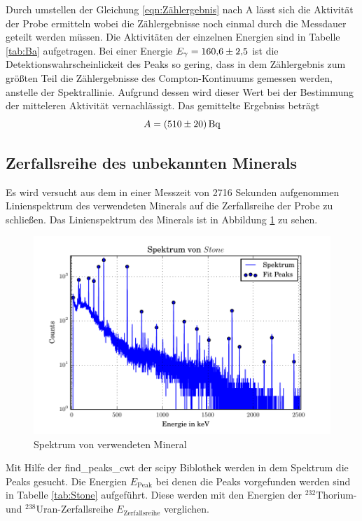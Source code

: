Durch umstellen der Gleichung \ref{eqn:Zählergebnis} nach A lässt sich die Aktivität der Probe ermitteln wobei die Zählergebnisse noch einmal durch die Messdauer geteilt werden müssen. Die Aktivitäten der einzelnen Energien sind in Tabelle \ref{tab:Ba} aufgetragen. Bei einer Energie $E_\gamma = \num{160,6 +- 2,5}$ ist die Detektionswahrscheinlickeit des Peaks so gering, dass in dem  Zählergebnis zum größten Teil die Zählergebnisse des Compton-Kontinuums gemessen werden, anstelle der Spektrallinie. Aufgrund dessen wird dieser Wert bei der Bestimmung der mitteleren Aktivität vernachlässigt. Das gemittelte Ergebniss beträgt
\begin{equation}
  A = (\num{510 +- 20}) \, \text{Bq}
  \label{eqn:aktBq}
\end{equation}
\subsection{Zerfallsreihe des unbekannten Minerals}
Es wird versucht aus dem in einer Messzeit von 2716 Sekunden aufgenommen Linienspektrum des verwendeten Minerals auf die Zerfallsreihe der Probe zu schließen. Das Linienspektrum des Minerals ist in Abbildung \ref{fig:Stone} zu sehen.
\begin{figure}[h]
  \centering
  \includegraphics[width=\textwidth]{./build/SpektSt.pdf}
  \caption{Spektrum von verwendeten Mineral}
  \label{fig:Stone}
\end{figure}
Mit Hilfe der find\_peaks\_cwt der scipy Biblothek werden in dem Spektrum die Peaks gesucht. Die Energien $E_\text{Peak}$ bei denen die Peaks vorgefunden werden sind in Tabelle \ref{tab:Stone} aufgeführt. Diese werden mit den Energien der $^{232}$Thorium- und $^{238}$Uran-Zerfallsreihe $E_\text{Zerfallsreihe}$ verglichen.
